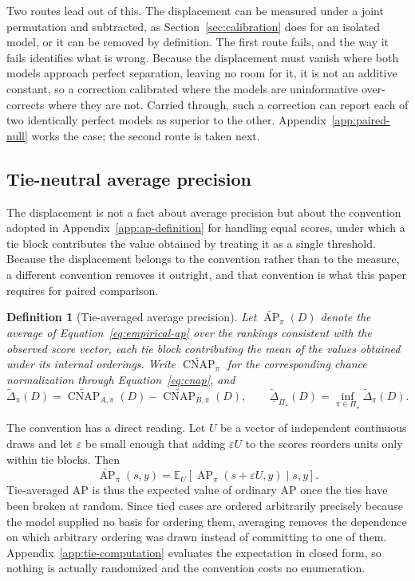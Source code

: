 \documentclass[11pt]{article}
\newcommand{\AP}{\operatorname{AP}}
\newcommand{\CNAP}{\operatorname{CNAP}}
\newcommand{\PSet}{\Pi_\star}
\newcommand{\E}{\mathbb{E}}
\newcommand{\APta}{\widetilde{\AP}}
\newcommand{\CNAPta}{\widetilde{\CNAP}}
\newcommand{\Dta}{\widetilde{\Delta}}
\newcommand{\RobDta}{\underline{\widetilde{\Delta}}_{\PSet}}
\newtheorem{definition}{Definition}
\theoremstyle{remark}
\begin{document}
Two routes lead out of this. The displacement can be measured under a joint permutation and subtracted, as Section~\ref{sec:calibration} does for an isolated model, or it can be removed by definition. The first route fails, and the way it fails identifies what is wrong. Because the displacement must vanish where both models approach perfect separation, leaving no room for it, it is not an additive constant, so a correction calibrated where the models are uninformative over-corrects where they are not. Carried through, such a correction can report each of two identically perfect models as superior to the other. Appendix~\ref{app:paired-null} works the case; the second route is taken next.

\subsection{Tie-neutral average precision}
\label{sec:paired-convention}

The displacement is not a fact about average precision but about the convention adopted in Appendix~\ref{app:ap-definition} for handling equal scores, under which a tie block contributes the value obtained by treating it as a single threshold. Because the displacement belongs to the convention rather than to the measure, a different convention removes it outright, and that convention is what this paper requires for paired comparison.

\begin{definition}[Tie-averaged average precision]
Let $\APta_\pi(D)$ denote the average of Equation~\eqref{eq:empirical-ap} over the rankings consistent with the observed score vector, each tie block contributing the mean of the values obtained under its internal orderings. Write $\CNAPta_\pi$ for the corresponding chance normalization through Equation~\eqref{eq:cnap}, and
\[
\Dta_\pi(D)
=
\CNAPta_{A,\pi}(D)-\CNAPta_{B,\pi}(D),
\qquad
\RobDta(D)
=
\inf_{\pi\in\PSet}\Dta_\pi(D).
\]
\end{definition}

The convention has a direct reading. Let $U$ be a vector of independent continuous draws and let $\varepsilon$ be small enough that adding $\varepsilon U$ to the scores reorders units only within tie blocks. Then
\begin{equation}
\APta_\pi(s,y)
=
\E_U\left[\AP_\pi(s+\varepsilon U,y)\mid s,y\right].
\label{eq:jitter}
\end{equation}
Tie-averaged AP is thus the expected value of ordinary AP once the ties have been broken at random. Since tied cases are ordered arbitrarily precisely because the model supplied no basis for ordering them, averaging removes the dependence on which arbitrary ordering was drawn instead of committing to one of them. Appendix~\ref{app:tie-computation} evaluates the expectation in closed form, so nothing is actually randomized and the convention costs no enumeration.
\end{document}

